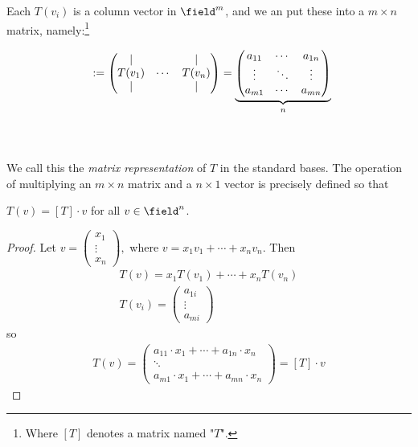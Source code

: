 Each $T(v_i)$ is a column vector in $\field^m$, and we an put these into a $m \times n$ matrix, namely:\footnote{Where $[T]$ denotes a matrix named "$T$".}

\begin{align*}
    [T] := \begin{pmatrix}
        \vert & & \vert \\
        T(v_1) & \cdots & T(v_n) \\
        \vert & & \vert 
    \end{pmatrix} = \underbrace{\begin{pmatrix}
        a_{11} & \cdots & a_{1n}\\
        \vdots & \ddots & \vdots\\
        a_{m1} & \cdots & a_{mn}
    \end{pmatrix}}_{n}
    \hspace{-0.6em}
        \\\\\\
\end{align*}

We call this the \emph{matrix representation} of $T$ in the standard bases. The operation of multiplying an $m \times n$ matrix and a $n \times 1$ vector is precisely defined so that \begin{proposition}\label{prop:tofvequalmatt}
    $T(v) = [T] \cdot v$ for all $v \in \field^n$.
\end{proposition}

\begin{proof}
    Let $v = \begin{pmatrix}
        x_1\\
        \vdots\\
        x_n
    \end{pmatrix},$ where $v = x_1 v_1 + \cdots + x_n v_n$. Then \begin{align*}
        T(v) = x_1 T(v_1) + \cdots + x_n T(v_n)\\
        T(v_i) = \begin{pmatrix}
            a_{1i}\\
            \vdots\\
            a_{mi}
        \end{pmatrix}
    \end{align*}
    so
    \begin{align*}
        T(v) = \begin{pmatrix}
            a_{11} \cdot x_1 + \cdots + a_{1n} \cdot x_n\\
            \ddots \\
            a_{m1} \cdot x_1 + \cdots + a_{mn} \cdot x_n
        \end{pmatrix} = [T]\cdot v  
    \end{align*}
\end{proof}

